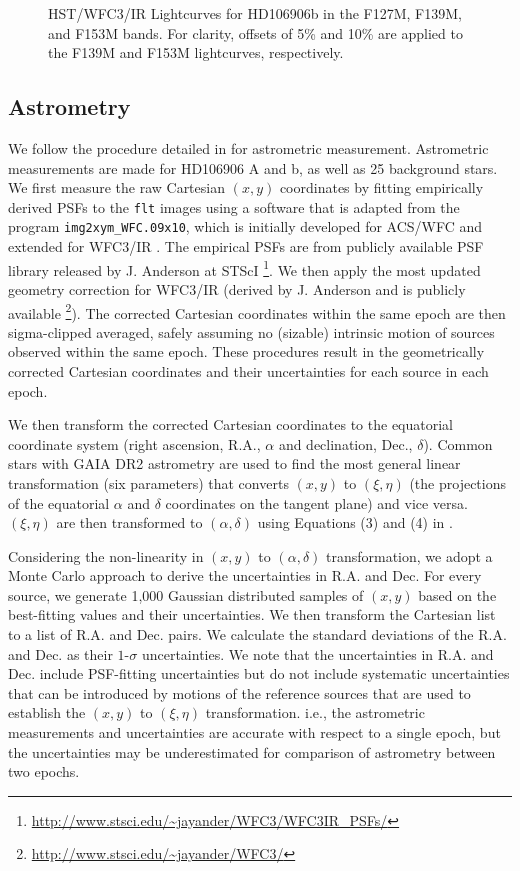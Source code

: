 \documentclass[twocolumn, trackchanges]{aastex62}
\begin{document}
\begin{figure}[!h]
  \centering
  \caption{HST/WFC3/IR Lightcurves for HD106906b in the F127M, F139M, and F153M bands. For clarity,  offsets of 5\% and 10\% are applied to the F139M and F153M lightcurves, respectively.}
  \label{fig:lightcurve}
\end{figure}


\subsection{Astrometry}
We follow the procedure detailed in \citet{Bedin2018} for astrometric measurement. Astrometric measurements are made for HD106906 A and b, as well as 25 background stars.
We first measure the raw Cartesian $(x, y)$ coordinates by fitting empirically derived PSFs to the \texttt{flt} images using a software that is adapted from the program \texttt{img2xym\_WFC.09x10}, which is initially developed for ACS/WFC \citep{Anderson2006} and extended for WFC3/IR \citep[e.g., employed in][]{Bedin2018}. The empirical PSFs are from publicly available PSF library released by J. Anderson at STScI \footnote{\url{http://www.stsci.edu/~jayander/WFC3/WFC3IR\_PSFs/}}.  We then apply the most updated geometry correction for WFC3/IR  (derived by J. Anderson and is publicly available \footnote{\url{http://www.stsci.edu/~jayander/WFC3/}}). The corrected Cartesian coordinates within the same epoch are then sigma-clipped averaged,  safely assuming no (sizable) intrinsic motion of sources observed within the same epoch. These procedures result in the geometrically corrected Cartesian coordinates and their uncertainties for each source in each epoch.

We then transform the corrected Cartesian coordinates to the equatorial coordinate system (right ascension, {R.A.}, $\alpha$ and declination, {Dec.}, $\delta$). Common stars with GAIA DR2 astrometry \citep{Gaia2018} are used to find the most general linear transformation (six parameters) that converts $(x, y)$ to $(\xi,\eta)$ (the projections of the equatorial $\alpha$ and $\delta$ coordinates on the tangent plane) and vice versa. $(\xi, \eta)$ are then transformed to $(\alpha, \delta)$ using Equations (3) and (4) in \citet{Bedin2018}.

Considering the non-linearity in $(x, y)$ to $(\alpha, \delta)$ transformation, we adopt a Monte Carlo approach to derive the uncertainties in {R.A.} and {Dec.}  For every source, we generate 1,000 Gaussian distributed samples of $(x, y)$  based on the best-fitting values and their uncertainties. We then transform the Cartesian list  to  a list of {R.A.} and {Dec.} pairs. We calculate the standard deviations of the {R.A.} and {Dec.} as their $1$-$\sigma$ uncertainties. We note that the uncertainties in R.A. and Dec. include PSF-fitting uncertainties but do not include systematic uncertainties that can be introduced by motions of the reference sources that are used to establish the $(x, y)$ to $(\xi,\eta)$ transformation. i.e., the astrometric measurements and uncertainties are accurate with respect to a single epoch, but the uncertainties may be underestimated for comparison of astrometry between two epochs. 
\end{document}
